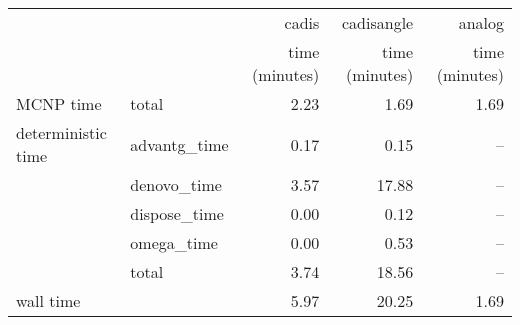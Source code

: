 \begin{tabular}{llrrr}
\toprule
          &              &          cadis &     cadisangle &         analog \\
          &              & time (minutes) & time (minutes) & time (minutes) \\
\midrule
MCNP time & total &           2.23 &           1.69 &           1.69 \\
deterministic time & advantg\_time &           0.17 &           0.15 &            -- \\
          & denovo\_time &           3.57 &          17.88 &            -- \\
          & dispose\_time &           0.00 &           0.12 &            -- \\
          & omega\_time &           0.00 &           0.53 &            -- \\
          & total &           3.74 &          18.56 &            -- \\
wall time &              &           5.97 &          20.25 &           1.69 \\
\bottomrule
\end{tabular}

